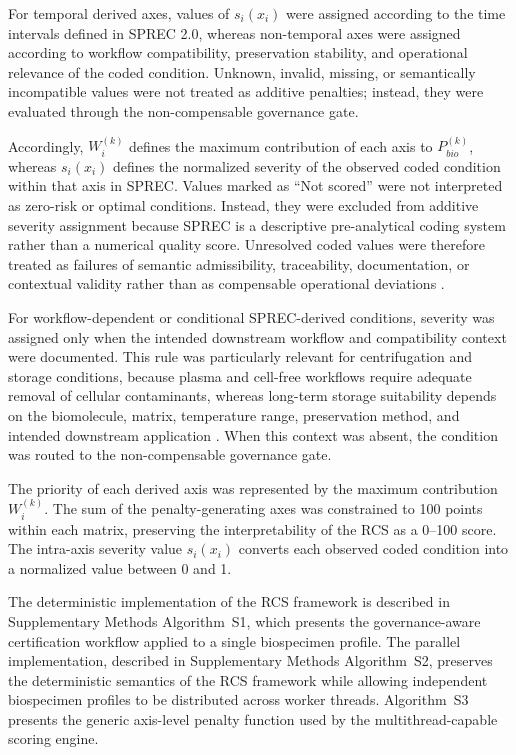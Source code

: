 \documentclass[preprint,12pt]{elsarticle}
\begin{document}
For temporal derived axes, values of \(s_i(x_i)\) were assigned according to the time intervals defined in SPREC 2.0, whereas non-temporal axes were assigned according to workflow compatibility, preservation stability, and operational relevance of the coded condition. Unknown, invalid, missing, or semantically incompatible values were not treated as additive penalties; instead, they were evaluated through the non-compensable governance gate.

Accordingly, \(W_i^{(k)}\) defines the maximum contribution of each axis to \(P_{bio}^{(k)}\), whereas \(s_i(x_i)\) defines the normalized severity of the observed coded condition within that axis in SPREC. Values marked as ``Not scored'' were not interpreted as zero-risk or optimal conditions. Instead, they were excluded from additive severity assignment because SPREC is a descriptive pre-analytical coding system rather than a numerical quality score. Unresolved coded values were therefore treated as failures of semantic admissibility, traceability, documentation, or contextual validity rather than as compensable operational deviations \cite{lehmann2012,merinomartinez2016,campbell2018,iso20387}.

For workflow-dependent or conditional SPREC-derived conditions, severity was assigned only when the intended downstream workflow and compatibility context were documented. This rule was particularly relevant for centrifugation and storage conditions, because plasma and cell-free workflows require adequate removal of cellular contaminants, whereas long-term storage suitability depends on the biomolecule, matrix, temperature range, preservation method, and intended downstream application \cite{hassis2015,binderup2016,mendy2017iarc}. When this context was absent, the condition was routed to the non-compensable governance gate.

The priority of each derived axis was represented by the maximum contribution \(W_i^{(k)}\). The sum of the penalty-generating axes was constrained to 100 points within each matrix, preserving the interpretability of the RCS as a 0--100 score. The intra-axis severity value \(s_i(x_i)\) converts each observed coded condition into a normalized value between 0 and 1.

The deterministic implementation of the RCS framework is described in Supplementary Methods Algorithm~S1, which presents the governance-aware certification workflow applied to a single biospecimen profile. The parallel implementation, described in Supplementary Methods Algorithm~S2, preserves the deterministic semantics of the RCS framework while allowing independent biospecimen profiles to be distributed across worker threads. Algorithm~S3 presents the generic axis-level penalty function used by the multithread-capable scoring engine.
\end{document}
